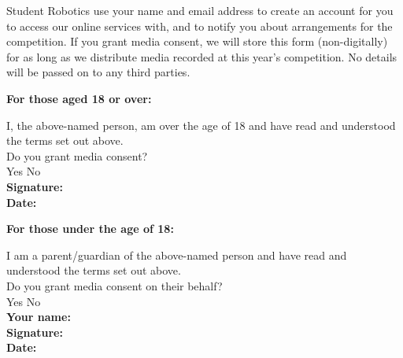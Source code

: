 \documentclass[a4paper,10pt]{article}
\newcommand{\checkbox}[1]{#1\hspace{0.2cm}\raisebox{-0.3mm}{$\square$}}
\newcommand{\textfield}[1]{\textbf{#1:} \hrulefill\hspace{0mm}}
\newcommand{\fieldsep}{\\[2.5mm]}
\begin{document}
Student Robotics use your name and email address to create an account for you to access our online services with, and to notify you about arrangements for the competition.
If you grant media consent, we will store this form (non-digitally) for as long as we distribute media recorded at this year's competition.
No details will be passed on to any third parties. \\

\begin{minipage}[t]{0.48\textwidth}
\textbf{For those aged 18 or over:}

I, the above-named person, am over the age of 18 and have read and understood the terms set out above.\\

Do you grant media consent? \\[2mm]
\checkbox{Yes} \hspace{1cm} \checkbox{No}\\

\textfield{Signature} \fieldsep
\textfield{Date}
\end{minipage}
\hspace{0.02\textwidth}
\begin{minipage}[t]{0.48\textwidth}
\textbf{For those under the age of 18:}

I am a parent/guardian of the above-named person and have read and understood the terms set out above.\\

Do you grant media consent on their behalf?\\[2mm]
\checkbox{Yes} \hspace{1cm} \checkbox{No}\\

\textfield{Your name} \fieldsep
\textfield{Signature} \fieldsep
\textfield{Date}
\end{minipage}
\end{document}
